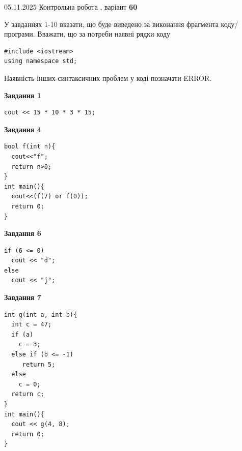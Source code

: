 \documentclass[12pt, ukrainian]{article}
\begin{document}
{\Large{05.11.2025 Контрольна робота , варіант  \No \textbf { 60 }\par}}
{
\begin {large}
У завданнях 1-10 вказати, що буде виведено за виконання фрагмента коду/про\-гра\-ми.
Вважати, що за потреби наявні рядки коду
\begin{verbatim}
#include <iostream>
using namespace std;
\end{verbatim}
Наявність інших синтаксичних проблем у коді позначати ERROR.

\begin{minipage}[t]{7.0cm}

\begin{center}
\textbf{Завдання 1}
\end{center}
\vspace{-8mm}

\begin{verbatim}
cout << 15 * 10 * 3 * 15;
\end{verbatim}



\begin{center}
\textbf{Завдання 4}
\end{center}
\vspace{-8mm}

\begin{verbatim}
bool f(int n){
  cout<<"f";
  return n>0;
}
int main(){
  cout<<(f(7) or f(0));
  return 0;
}
\end{verbatim}



\begin{center}
\textbf{Завдання 6}
\end{center}
\vspace{-8mm}

\begin{verbatim}
if (6 <= 0)
  cout << "d";
else
  cout << "j";
\end{verbatim}



\begin{center}
\textbf{Завдання 7}
\end{center}
\vspace{-8mm}

\begin{verbatim}
int g(int a, int b){
  int c = 47;
  if (a)
    c = 3;
  else if (b <= -1)
     return 5;
  else
    c = 0;
  return c;
}
int main(){
  cout << g(4, 8);
  return 0;
}
\end{verbatim}


\end{minipage}
\end{large}}
\end{document}
